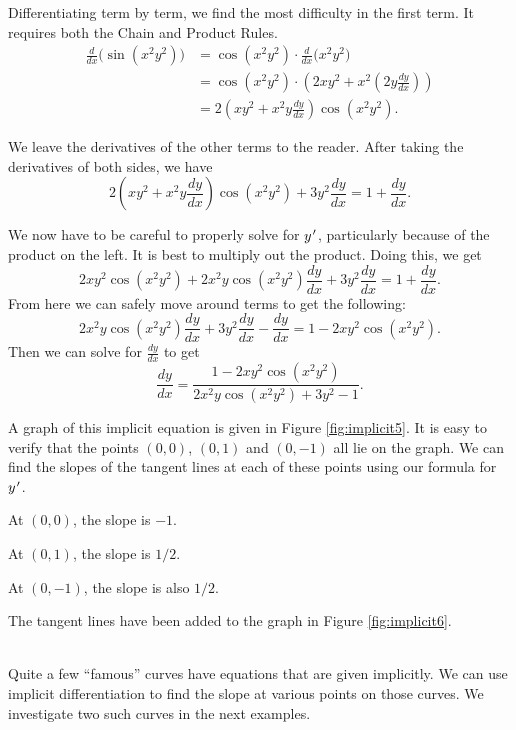 {Differentiating term by term, we find the most difficulty in the first term.  It requires both the Chain and Product Rules.
		\begin{align*}
		\frac{d}{dx}\Big(\sin(x^2y^2)\Big) &= \cos(x^2y^2)\cdot\frac{d}{dx}\Big(x^2y^2\Big) \\
																				&= \cos(x^2y^2)\cdot\left(2xy^2+x^2\left(2y\frac{dy}{dx}\right)\right)\\
																				&= 2\left(xy^2+x^2y\frac{dy}{dx}\right)\cos(x^2y^2).
		\end{align*}  

We leave the derivatives of the other terms to the reader. After taking the derivatives of both sides, we have
$$2\left(xy^2+x^2y\frac{dy}{dx}\right)\cos(x^2y^2) + 3y^2\frac{dy}{dx} = 1 + \frac{dy}{dx}.$$

We now have to be careful to properly solve for $y\hskip.75pt'$, particularly because of the product on the left.  It is best to multiply out the product.  Doing this, we get
$$2xy^2\cos(x^2y^2)+2x^2y\cos(x^2y^2)\frac{dy}{dx}  + 3y^2\frac{dy}{dx} = 1 + \frac{dy}{dx}.$$
From here we can safely move around terms to get the following:
$$2x^2y\cos(x^2y^2)\frac{dy}{dx} + 3y^2\frac{dy}{dx} - \frac{dy}{dx} = 1 - 2xy^2\cos(x^2y^2).$$
Then we can solve for $\frac{dy}{dx}$ to get
$$\frac{dy}{dx} = \frac{1 - 2xy^2\cos(x^2y^2)}{2x^2y\cos(x^2y^2)+3y^2-1}.$$

A graph of this implicit equation is given in Figure \ref{fig:implicit5}. It is easy to verify that the points $(0,0)$, $(0,1)$ and $(0,-1)$ all lie on the graph. We can find the slopes of the tangent lines at each of these points using our formula for $y\hskip.75pt'$. 


At $(0,0)$, the slope is $-1$.

At $(0,1)$, the slope is $1/2$.

At $(0,-1)$, the slope is also $1/2$.

The tangent lines have been added to the graph in Figure \ref{fig:implicit6}.
}\\


Quite a few ``famous'' curves have equations that are given implicitly.  We can use implicit differentiation to find the slope at various points on those curves. We investigate two such curves in the next examples.\\


